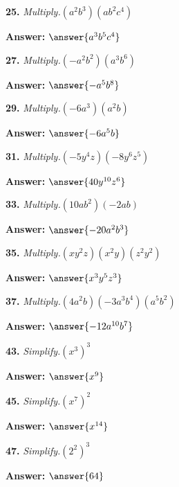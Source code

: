 \documentclass{ximera}
\begin{document}
\begin{problem}
\textbf{25.} \emph{Multiply.}\quad $(a^2b^3)(ab^2c^4)$

\textbf{Answer:} $\answer{a^3b^5c^4}$
\end{problem}

\begin{problem}
\textbf{27.} \emph{Multiply.}\quad $(-a^2b^2)(a^3b^6)$

\textbf{Answer:} $\answer{-a^5b^8}$
\end{problem}

\begin{problem}
\textbf{29.} \emph{Multiply.}\quad $(-6a^3)(a^2b)$

\textbf{Answer:} $\answer{-6a^5b}$
\end{problem}

\begin{problem}
\textbf{31.} \emph{Multiply.}\quad $(-5y^4z)(-8y^6z^5)$

\textbf{Answer:} $\answer{40y^{10}z^6}$
\end{problem}

\begin{problem}
\textbf{33.} \emph{Multiply.}\quad $(10ab^2)(-2ab)$

\textbf{Answer:} $\answer{-20a^2b^3}$
\end{problem}

\begin{problem}
\textbf{35.} \emph{Multiply.}\quad $(xy^2z)(x^2y)(z^2y^2)$

\textbf{Answer:} $\answer{x^3y^5z^3}$
\end{problem}

\begin{problem}
\textbf{37.} \emph{Multiply.}\quad $(4a^2b)(-3a^3b^4)(a^5b^2)$

\textbf{Answer:} $\answer{-12a^{10}b^7}$
\end{problem}

\begin{problem}
\textbf{43.} \emph{Simplify.}\quad $(x^3)^3$

\textbf{Answer:} $\answer{x^9}$
\end{problem}

\begin{problem}
\textbf{45.} \emph{Simplify.}\quad $(x^7)^2$

\textbf{Answer:} $\answer{x^{14}}$
\end{problem}

\begin{problem}
\textbf{47.} \emph{Simplify.}\quad $(2^2)^3$

\textbf{Answer:} $\answer{64}$
\end{problem}
\end{document}
